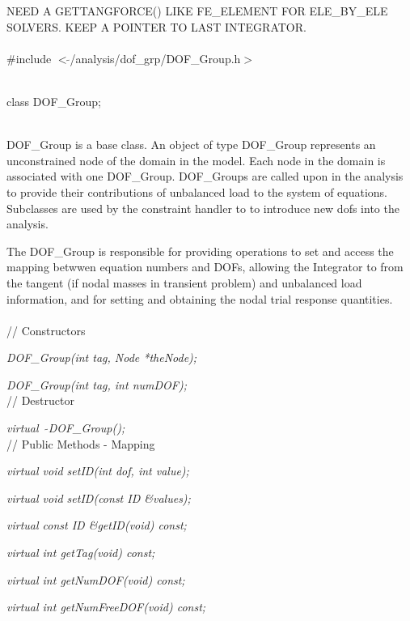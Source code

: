 
NEED A GETTANGFORCE() LIKE FE\_ELEMENT FOR ELE\_BY\_ELE SOLVERS. KEEP A
POINTER TO LAST INTEGRATOR. \\

   \\
\#include $<\tilde{ }$/analysis/dof\_grp/DOF\_Group.h$>$  


  \\
class DOF\_Group;  


  \\
\indent DOF\_Group is a base class. An object of type DOF\_Group
represents an unconstrained node of the domain in the model. Each node
in the domain is associated with one DOF\_Group. DOF\_Groups are
called upon in the analysis to provide their contributions of
unbalanced load to the system of equations. Subclasses are used by the
constraint handler to to introduce new dofs into the analysis. 

The DOF\_Group is responsible for providing operations to set and
access the mapping betwwen equation numbers and DOFs, allowing the
Integrator to from the tangent (if nodal masses in transient problem)
and unbalanced load information, and for setting and obtaining the
nodal trial response quantities. \\


  \\
// Constructors  

{\em DOF\_Group(int tag, Node *theNode);}  

{\em DOF\_Group(int tag, int numDOF);}  \\ 

// Destructor  

{\em virtual~ $\tilde{}$DOF\_Group();}  \\

// Public Methods - Mapping  

{\em virtual void setID(int dof, int value);} 

{\em virtual void setID(const ID \&values);} 

{\em virtual const ID \&getID(void) const;} 

{\em virtual int getTag(void) const;} 

{\em virtual int getNumDOF(void) const;}

{\em virtual int getNumFreeDOF(void) const;}

